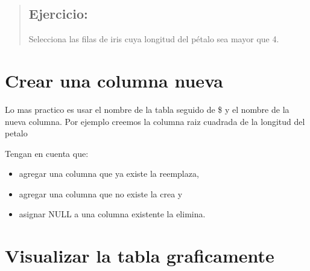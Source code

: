 \documentclass[
]{book}
\newenvironment{Shaded}{\begin{snugshade}}{\end{snugshade}}
\newcommand{\CommentTok}[1]{\textcolor[rgb]{0.56,0.35,0.01}{\textit{#1}}}
\newcommand{\KeywordTok}[1]{\textcolor[rgb]{0.13,0.29,0.53}{\textbf{#1}}}
\newcommand{\NormalTok}[1]{#1}
\newcommand{\OperatorTok}[1]{\textcolor[rgb]{0.81,0.36,0.00}{\textbf{#1}}}
\newcommand{\StringTok}[1]{\textcolor[rgb]{0.31,0.60,0.02}{#1}}
\providecommand{\tightlist}{%
  \setlength{\itemsep}{0pt}\setlength{\parskip}{0pt}}
\begin{document}
\begin{Shaded}
\end{Shaded}

\begin{quote}
\hypertarget{ejercicio}{%
\subsection{Ejercicio:}\label{ejercicio}}

Selecciona las filas de iris cuya longitud del pétalo sea mayor que 4.
\end{quote}

\hypertarget{crear-una-columna-nueva}{%
\section{Crear una columna nueva}\label{crear-una-columna-nueva}}

Lo mas practico es usar el nombre de la tabla seguido de \$ y el nombre de la nueva columna. Por ejemplo creemos la columna raiz cuadrada de la longitud del petalo

\begin{Shaded}
\end{Shaded}

Tengan en cuenta que:

\begin{itemize}
\tightlist
\item
  agregar una columna que ya existe la reemplaza,
\item
  agregar una columna que no existe la crea y
\item
  asignar NULL a una columna existente la elimina.
\end{itemize}

\hypertarget{visualizar-la-tabla-graficamente}{%
\section{Visualizar la tabla graficamente}\label{visualizar-la-tabla-graficamente}}
\end{document}

